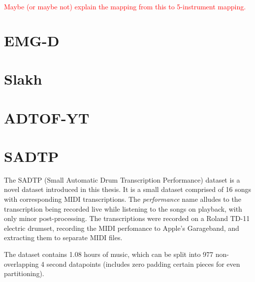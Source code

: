 \textcolor{red}{Maybe (or maybe not) explain the mapping from this to 5-instrument mapping.}

\section{EMG-D}

\section{Slakh}

\section{ADTOF-YT}

\section{SADTP}

The SADTP (Small Automatic Drum Transcription Performance) dataset is a novel dataset introduced in this thesis. It is a small dataset comprised of 16 songs with corresponding MIDI transcriptions. The \textit{performance} name alludes to the transcription being recorded live while listening to the songs on playback, with only minor post-processing. The transcriptions were recorded on a Roland TD-11 electric drumset, recording the MIDI perfomance to Apple's Garageband, and extracting them to separate MIDI files.

The dataset contains 1.08 hours of music, which can be split into 977 non-overlapping 4 second datapoints (includes zero padding certain pieces for even partitioning).